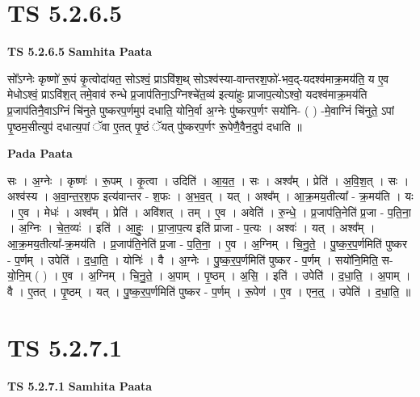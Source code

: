 \documentclass[17pt]{extarticle}
\begin{document}
\section*{ TS 5.2.6.5 }

\textbf{TS 5.2.6.5 } \newline
\textbf{Samhita Paata} \newline

सो᳚ऽग्नेः कृष्णो॑ रू॒पं कृ॒त्वोदा॑यत॒ सोऽश्वं॒ प्राऽवि॑श॒थ् सोऽश्व॑स्या-वान्तरश॒फो॑-भव॒द्-यदश्व॑माक्र॒मय॑ति॒ य ए॒व मेधोऽश्वं॒ प्राऽवि॑श॒त् तमे॒वाव॑ रुन्धे प्र॒जाप॑तिना॒ऽग्निश्चे॑त॒व्य॑ इत्या॑हुः प्राजाप॒त्योऽश्वो॒ यदश्व॑माक्र॒मय॑ति प्र॒जाप॑तिनै॒वाऽग्निं चि॑नुते पुष्करप॒र्णमुप॑ दधाति॒ योनि॒र्वा अ॒ग्नेः पु॑ष्करप॒र्णꣳ सयो॑नि- ( ) -मे॒वाग्निं चि॑नुते॒ ऽपां पृ॒ष्ठम॒सीत्युप॑ दधात्य॒पां ॅवा ए॒तत् पृ॒ष्ठं ॅयत् पु॑ष्करप॒र्णꣳ रू॒पेणै॒वैन॒दुप॑ दधाति ॥ \newline

\textbf{Pada Paata} \newline

सः । अ॒ग्नेः । कृष्णः॑ । रू॒पम् । कृ॒त्वा । उदिति॑ । आ॒य॒त॒ । सः । अश्व᳚म् । प्रेति॑ । अ॒वि॒श॒त् । सः । अश्व॑स्य । अ॒वा॒न्त॒र॒श॒फ इत्य॑वान्तर - श॒फः । अ॒भ॒व॒त् । यत् । अश्व᳚म् । आ॒क्र॒मय॒तीत्या᳚ - क्र॒मय॑ति । यः । ए॒व । मेधः॑ । अश्व᳚म् । प्रेति॑ । अवि॑शत् । तम् । ए॒व । अवेति॑ । रु॒न्धे॒ । प्र॒जाप॑ति॒नेति॑ प्र॒जा - प॒ति॒ना॒ । अ॒ग्निः । चे॒त॒व्यः॑ । इति॑ । आ॒हुः॒ । प्रा॒जा॒प॒त्य इति॑ प्राजा - प॒त्यः । अश्वः॑ । यत् । अश्व᳚म् । आ॒क्र॒मय॒तीत्या᳚-क्र॒मय॑ति । प्र॒जाप॑ति॒नेति॑ प्र॒जा - प॒ति॒ना॒ । ए॒व । अ॒ग्निम् । चि॒नु॒ते॒ । पु॒ष्क॒र॒प॒र्णमिति॑ पुष्कर - प॒र्णम् । उपेति॑ । द॒धा॒ति॒ । योनिः॑ । वै । अ॒ग्नेः । पु॒ष्क॒र॒प॒र्णमिति॑ पुष्कर - प॒र्णम् । सयो॑नि॒मिति॒ स-यो॒नि॒म् ( ) । ए॒व । अ॒ग्निम् । चि॒नु॒ते॒ । अ॒पाम् । पृ॒ष्ठम् । अ॒सि॒ । इति॑ । उपेति॑ । द॒धा॒ति॒ । अ॒पाम् । वै । ए॒तत् । पृ॒ष्ठम् । यत् । पु॒ष्क॒र॒प॒र्णमिति॑ पुष्कर - प॒र्णम् । रू॒पेण॑ । ए॒व । एन॒त्॒ । उपेति॑ । द॒धा॒ति॒ ॥  \newline




\section*{ TS 5.2.7.1 }

\textbf{TS 5.2.7.1 } \newline
\textbf{Samhita Paata} \newline
\end{document}
